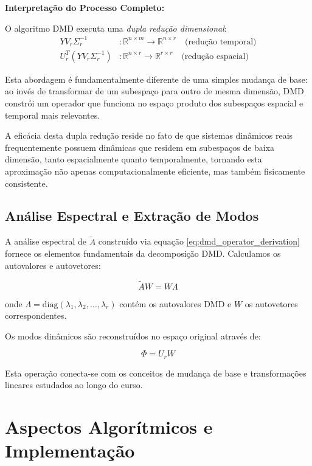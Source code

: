 \documentclass[a4,11pt]{pssbmac}
\begin{document}
\textbf{Interpretação do Processo Completo:}

O algoritmo DMD executa uma \textit{dupla redução dimensional}:
\begin{align}
Y V_r \Sigma_r^{-1} &: \mathbb{R}^{n \times m} \rightarrow \mathbb{R}^{n \times r} \quad \text{(redução temporal)}\\
U_r^T (Y V_r \Sigma_r^{-1}) &: \mathbb{R}^{n \times r} \rightarrow \mathbb{R}^{r \times r} \quad \text{(redução espacial)}
\end{align}

Esta abordagem é fundamentalmente diferente de uma simples mudança de base: ao invés de transformar de um subespaço para outro de mesma dimensão, DMD constrói um operador que funciona no espaço produto dos subespaços espacial e temporal mais relevantes.

A eficácia desta dupla redução reside no fato de que sistemas dinâmicos reais frequentemente possuem dinâmicas que residem em subespaços de baixa dimensão, tanto espacialmente quanto temporalmente, tornando esta aproximação não apenas computacionalmente eficiente, mas também fisicamente consistente.

\subsection{Análise Espectral e Extração de Modos}

A análise espectral de $\tilde{A}$ construído via equação \eqref{eq:dmd_operator_derivation} fornece os elementos fundamentais da decomposição DMD. Calculamos os autovalores e autovetores:

\begin{equation}
\tilde{A}W = W\Lambda \label{eq:eigendecomposition}
\end{equation}

onde $\Lambda = \text{diag}(\lambda_1, \lambda_2, \ldots, \lambda_r)$ contém os autovalores DMD e $W$ os autovetores correspondentes.

Os modos dinâmicos são reconstruídos no espaço original através de:

\begin{equation}
\Phi = U_r W \label{eq:dynamic_modes}
\end{equation}

Esta operação conecta-se com os conceitos de mudança de base e transformações lineares estudados ao longo do curso.

\section{Aspectos Algorítmicos e Implementação}
\end{document}
